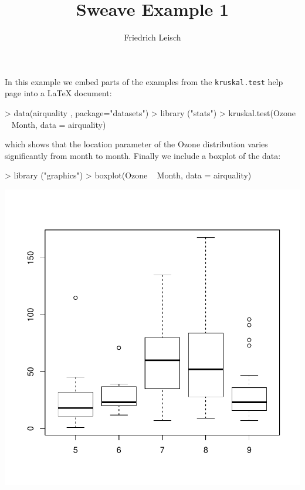 \documentclass[a4paper]{article}
\title{Sweave Example 1}
\author{Friedrich Leisch}
\begin{document}

\maketitle
In this example we embed parts of the examples from the 
\texttt{kruskal.test} help page into a \LaTeX{} document:

\begin{Schunk}
\begin{Sinput}
> data(airquality , package="datasets")
> library ("stats")
> kruskal.test(Ozone ~ Month, data = airquality) 
\end{Sinput}
\end{Schunk}

which shows that the location parameter of the Ozone distribution varies significantly from month to month. Finally we include a boxplot of the data:
\begin{center}
\begin{Schunk}
\begin{Sinput}
> library ("graphics")
> boxplot(Ozone ~ Month, data = airquality) 
\end{Sinput}
\end{Schunk}
\includegraphics{examp20-002}
\end{center}
\end{document}
